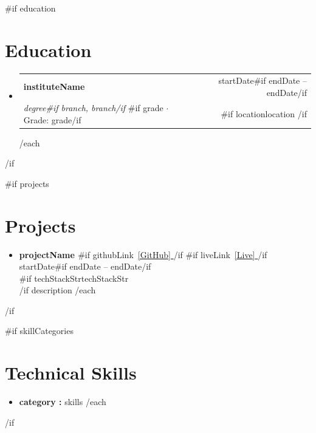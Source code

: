 \documentclass[10pt,a4paper]{article}
\newcommand{\link}[2]{\href{#1}{#2}}
\begin{document}
{{#if education}}
\section{Education}
\begin{itemize}[leftmargin=0pt, label={}, topsep=0pt, itemsep=4pt]
{{#each education}}
  \item
    \begin{tabularx}{\linewidth}{@{}Xr@{}}
      \textbf{ {{instituteName}} } & \textcolor{muted}{\small{}{{startDate}}{{#if endDate}} -- {{endDate}}{{/if}} }\\
      \textit{ {{degree}}{{#if branch}}, {{branch}}{{/if}} }{{#if grade}} $\cdot$ Grade: {{grade}}{{/if}} & {{#if location}}\textcolor{muted}{\small{}{{location}} }{{/if}}\\
    \end{tabularx}
{{/each}}
\end{itemize}
{{/if}}

{{#if projects}}
\section{Projects}
\begin{itemize}[leftmargin=0pt, label={}, topsep=0pt, itemsep=6pt]
{{#each projects}}
  \item
    \textbf{\textcolor{bodyText}{ {{projectName}} } }%
    {{#if githubLink}}\ \link{ {{githubLink}} }{\small{}\textcolor{accent}{[GitHub]} }{{/if}}%
    {{#if liveLink}}\ \link{ {{liveLink}} }{\small{}\textcolor{accent}{[Live]} }{{/if}}%
    \hfill \textcolor{muted}{\small{}{{startDate}}{{#if endDate}} -- {{endDate}}{{/if}} }\\
    {{#if techStackStr}}\textcolor{muted}{\small{}{{techStackStr}} }\\{{/if}}
    \small{}{{description}}
{{/each}}
\end{itemize}
{{/if}}

{{#if skillCategories}}
\section{Technical Skills}
\begin{itemize}[leftmargin=0pt, label={}, topsep=0pt, itemsep=2pt]
{{#each skillCategories}}
  \item \small{}\textbf{ {{category}} :} {{skills}}
{{/each}}
\end{itemize}
{{/if}}
\end{document}
